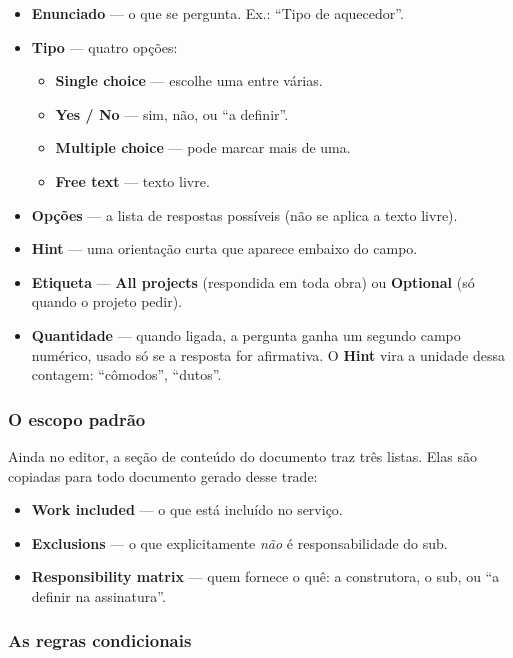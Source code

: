 \documentclass[11pt,a4paper]{article}
\newcommand{\ui}[1]{\textbf{\textsf{#1}}}
\begin{document}
\begin{itemize}
  \item \textbf{Enunciado} — o que se pergunta. Ex.: ``Tipo de aquecedor''.
  \item \textbf{Tipo} — quatro opções:
  \begin{itemize}
    \item \ui{Single choice} — escolhe uma entre várias.
    \item \ui{Yes / No} — sim, não, ou ``a definir''.
    \item \ui{Multiple choice} — pode marcar mais de uma.
    \item \ui{Free text} — texto livre.
  \end{itemize}
  \item \textbf{Opções} — a lista de respostas possíveis (não se aplica a texto livre).
  \item \ui{Hint} — uma orientação curta que aparece embaixo do campo.
  \item \textbf{Etiqueta} — \ui{All projects} (respondida em toda obra) ou
  \ui{Optional} (só quando o projeto pedir).
  \item \textbf{Quantidade} — quando ligada, a pergunta ganha um segundo campo
  numérico, usado só se a resposta for afirmativa. O \ui{Hint} vira a unidade
  dessa contagem: ``cômodos'', ``dutos''.
\end{itemize}

\subsubsection{O escopo padrão}

Ainda no editor, a seção de conteúdo do documento traz três listas. Elas são
copiadas para todo documento gerado desse trade:

\begin{itemize}
  \item \ui{Work included} — o que está incluído no serviço.
  \item \ui{Exclusions} — o que explicitamente \emph{não} é responsabilidade do sub.
  \item \ui{Responsibility matrix} — quem fornece o quê: a construtora, o sub, ou
  ``a definir na assinatura''.
\end{itemize}

\subsubsection{As regras condicionais}
\end{document}
